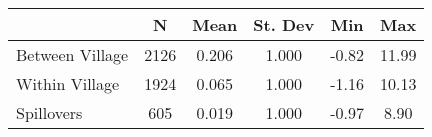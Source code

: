 \begin{tabular}{l*{5}{c}}\hline&\multicolumn{1}{c}{N}&\multicolumn{1}{c}{Mean}&\multicolumn{1}{c}{St. Dev}&\multicolumn{1}{c}{Min}&\multicolumn{1}{c}{Max}\\ \hline 
Between Village & 2126 & 0.206 & 1.000 & -0.82 & 11.99 \\
Within Village & 1924 & 0.065 & 1.000 & -1.16 & 10.13 \\
Spillovers & 605 & 0.019 & 1.000 & -0.97 & 8.90 \\
\hline \end{tabular}
